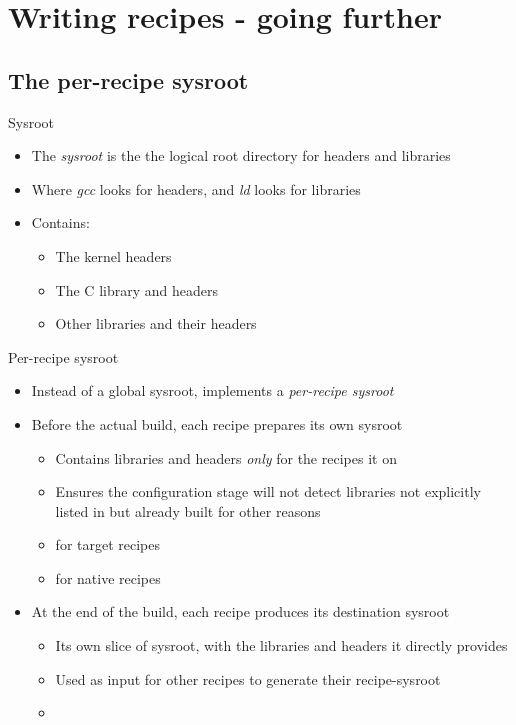 \section{Writing recipes - going further}

\subsection{The per-recipe sysroot}

\begin{frame}{Sysroot}
  \begin{itemize}
    \item The {\em sysroot} is the the logical root directory for headers
      and libraries
    \item Where {\em gcc} looks for headers, and {\em ld} looks for
      libraries
    \item Contains:
      \begin{itemize}
        \item The kernel headers
        \item The C library and headers
        \item Other libraries and their headers
      \end{itemize}
  \end{itemize}
\end{frame}

\begin{frame}{Per-recipe sysroot}
  \begin{itemize}
    \item Instead of a global sysroot,  implements a {\em
      per-recipe sysroot}
    \item Before the actual build, each recipe prepares its own sysroot
      \begin{itemize}
        \item Contains libraries and headers {\em only} for the recipes it
           on
        \item Ensures the configuration stage will not detect libraries not
          explicitly listed in  but already built for other
          reasons
        \item {} for target recipes
        \item {} for native recipes
      \end{itemize}
    \item At the end of the build, each recipe produces its destination
      sysroot
      \begin{itemize}
        \item Its own slice of sysroot, with the libraries and headers it
          directly provides
        \item Used as input for other recipes to generate their
          recipe-sysroot
        \item {}
      \end{itemize}
  \end{itemize}
\end{frame}


